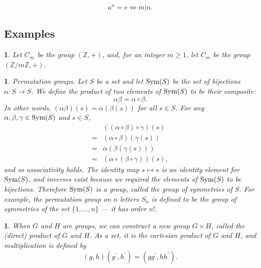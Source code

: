 \documentclass[a4paper,11pt,final]{memoir}%
\newtheorem{plain}[X]{}
\theoremstyle{nonumberplain}
\begin{document}
\[
a^{n}=e\iff m|n.
\]


\subsection{Examples}

\begin{plain}
\label{bd3a}Let $C_{\infty}$ be the group $(\mathbb{Z}{},+)$, and, for an
integer $m\geq1$, let $C_{m}$ be the group $(\mathbb{Z}/m\mathbb{Z}{},+)$.%
%

\end{plain}

\begin{plain}
\label{bd3b}\emph{Permutation groups.\/} Let $S$ be a set and let $\operatorname{Sym}(S)$ be
the set of bijections $\alpha\colon S\rightarrow S$. We define the product of
two elements of $\operatorname{Sym}(S)$ to be their composite:
\[
\alpha\beta=\alpha\circ\beta.
\]
In other words, $(\alpha\beta)(s)=\alpha(\beta(s))$ for all $s\in S$. For any
$\alpha,\beta,\gamma\in\operatorname{Sym}(S)$ and $s\in S$,
\begin{equation}
\begin{aligned}
  &\left(  (\alpha\circ\beta)\circ\gamma\right)  (s)\\
  =&(\alpha\circ\beta
  )(\gamma(s))\\
  =&\alpha(\beta(\gamma(s)))\\
  =&\left(  \alpha\circ(\beta\circ
\gamma)\right)  (s), \end{aligned}
\label{e11}%
\end{equation}
and so associativity holds. The identity map $s\mapsto s$ is an identity
element for $\operatorname{Sym}(S)$, and inverses exist because we required the elements of
$\operatorname{Sym}(S)$ to be bijections. Therefore $\operatorname{Sym}(S)$ is a group, called the
\emph{group of symmetries}%
of $S$. For example, the \emph{permutation group on} $n$ \emph{letters}%
%
%
\/ $S_{n}$ is defined to be the group of symmetries of the set $\{1,...,n\}$
--- it has order $n!$.
\end{plain}

\begin{plain}
\label{bd3c}When $G$ and $H$ are groups, we can construct a new group $G\times
H$, called the \emph{(direct) product\/}%
of $G$ and $H$. As a set, it is the cartesian product of $G$ and $H$, and
multiplication is defined by
\[
(g,h)(g^{\prime},h^{\prime})=(gg^{\prime},hh^{\prime}).
\]

\end{plain}
\end{document}
